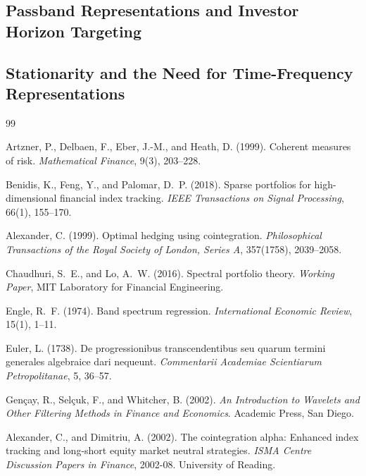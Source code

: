 \documentclass[12pt,a4paper]{article}
\begin{document}
\subsection{Passband Representations and Investor Horizon Targeting}
\label{sec:passband}

\subsection{Stationarity and the Need for Time-Frequency Representations}
\label{sec:stationarity}



\begin{thebibliography}{99}

Artzner, P., Delbaen, F., Eber, J.-M., and Heath, D. (1999).
\newblock Coherent measures of risk.
\newblock \emph{Mathematical Finance}, 9(3), 203--228.

Benidis, K., Feng, Y., and Palomar, D.~P. (2018).
\newblock Sparse portfolios for high-dimensional financial index tracking.
\newblock \emph{IEEE Transactions on Signal Processing}, 66(1), 155--170.

Alexander, C. (1999).
\newblock Optimal hedging using cointegration.
\newblock \emph{Philosophical Transactions of the Royal Society of London,
  Series A}, 357(1758), 2039--2058.

Chaudhuri, S.~E., and Lo, A.~W. (2016).
\newblock Spectral portfolio theory.
\newblock \emph{Working Paper}, MIT Laboratory for Financial Engineering.

Engle, R.~F. (1974).
\newblock Band spectrum regression.
\newblock \emph{International Economic Review}, 15(1), 1--11.

Euler, L. (1738).
\newblock De progressionibus transcendentibus seu quarum termini generales
  algebraice dari nequeunt.
\newblock \emph{Commentarii Academiae Scientiarum Petropolitanae}, 5,
  36--57.

Gen\c{c}ay, R., Sel\c{c}uk, F., and Whitcher, B. (2002).
\newblock \emph{An Introduction to Wavelets and Other Filtering Methods in
  Finance and Economics}.
\newblock Academic Press, San Diego.

Alexander, C., and Dimitriu, A. (2002).
\newblock The cointegration alpha: Enhanced index tracking and long-short
  equity market neutral strategies.
\newblock \emph{ISMA Centre Discussion Papers in Finance}, 2002-08.
\newblock University of Reading.


\end{thebibliography}
\end{document}
